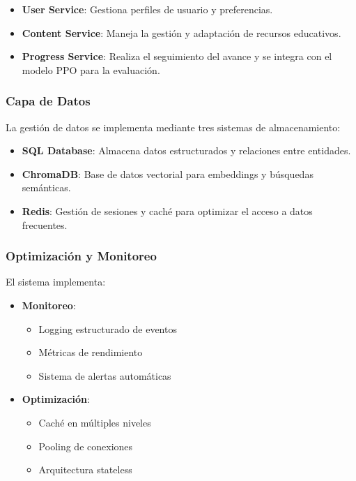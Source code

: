 \begin{itemize}
    \item \textbf{User Service}: Gestiona perfiles de usuario y preferencias.
    
    \item \textbf{Content Service}: Maneja la gestión y adaptación de recursos educativos.
    
    \item \textbf{Progress Service}: Realiza el seguimiento del avance y se integra con el modelo PPO para la evaluación.
\end{itemize}

\subsubsection{Capa de Datos}
\label{capa-datos}

La gestión de datos se implementa mediante tres sistemas de almacenamiento:

\begin{itemize}
    \item \textbf{SQL Database}: Almacena datos estructurados y relaciones entre entidades.
    
    \item \textbf{ChromaDB}: Base de datos vectorial para embeddings y búsquedas semánticas.
    
    \item \textbf{Redis}: Gestión de sesiones y caché para optimizar el acceso a datos frecuentes.
\end{itemize}

\subsubsection{Optimización y Monitoreo}
\label{optimizacion-monitoreo}

El sistema implementa:

\begin{itemize}
    \item \textbf{Monitoreo}:
    \begin{itemize}
        \item Logging estructurado de eventos
        \item Métricas de rendimiento
        \item Sistema de alertas automáticas
    \end{itemize}

    \item \textbf{Optimización}:
    \begin{itemize}
        \item Caché en múltiples niveles
        \item Pooling de conexiones
        \item Arquitectura stateless
    \end{itemize}
\end{itemize}



